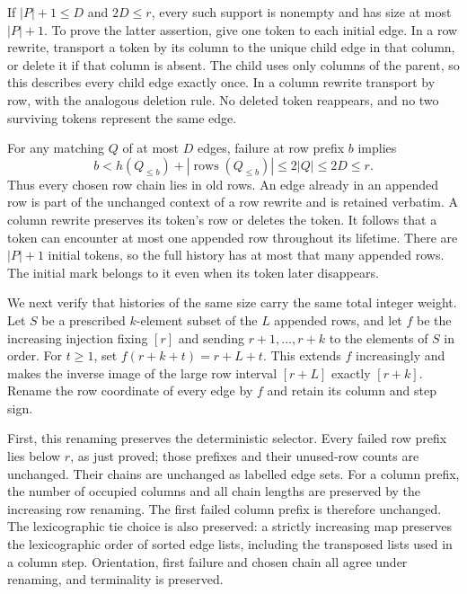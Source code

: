 If $|P|+1\leq D$ and $2D\leq r$, every such support is nonempty and has
size at most $|P|+1$.  To prove the latter assertion, give one token to
each initial edge.  In a row rewrite, transport a token by its column
to the unique child edge in that column, or delete it if that column
is absent.  The child uses only columns of the parent, so this describes
every child edge exactly once.  In a column rewrite transport by row,
with the analogous deletion rule.  No deleted token reappears, and no
two surviving tokens represent the same edge.

For any matching $Q$ of at most $D$ edges, failure at row prefix $b$
implies
\[
 b< h(Q_{\leq b})+
       |\operatorname{rows}(Q_{\leq b})|\leq 2|Q|\leq2D\leq r.
\]
Thus every chosen row chain lies in old rows.  An edge already in an
appended row is part of the unchanged context of a row rewrite and is
retained verbatim.  A column rewrite preserves its token's row or
deletes the token.  It follows that a token can encounter at most one
appended row throughout its lifetime.  There are $|P|+1$ initial tokens,
so the full history has at most that many appended rows.  The initial
mark belongs to it even when its token later disappears.

We next verify that histories of the same size carry the same total
integer weight.  Let $S$ be a prescribed $k$-element subset of the $L$
appended rows, and let $f$ be the increasing injection fixing $[r]$ and
sending $r+1,\ldots,r+k$ to the elements of $S$ in order.  For $t\geq1$, set $f(r+k+t)=r+L+t$.
This extends $f$ increasingly and makes the inverse image of the large
row interval $[r+L]$ exactly $[r+k]$.  Rename the row coordinate of every
edge by $f$ and retain its column and step sign.

First, this renaming preserves the deterministic selector.  Every failed
row prefix lies below $r$, as just proved; those prefixes and their
unused-row counts are unchanged.  Their chains are unchanged as labelled
edge sets.  For a column prefix, the number of occupied columns and all
chain lengths are preserved by the increasing row renaming.  The first
failed column prefix is therefore unchanged.  The lexicographic tie
choice is also preserved: a strictly increasing map preserves the
lexicographic order of sorted edge lists, including the transposed lists
used in a column step.  Orientation, first failure and chosen chain all
agree under renaming, and terminality is preserved.

